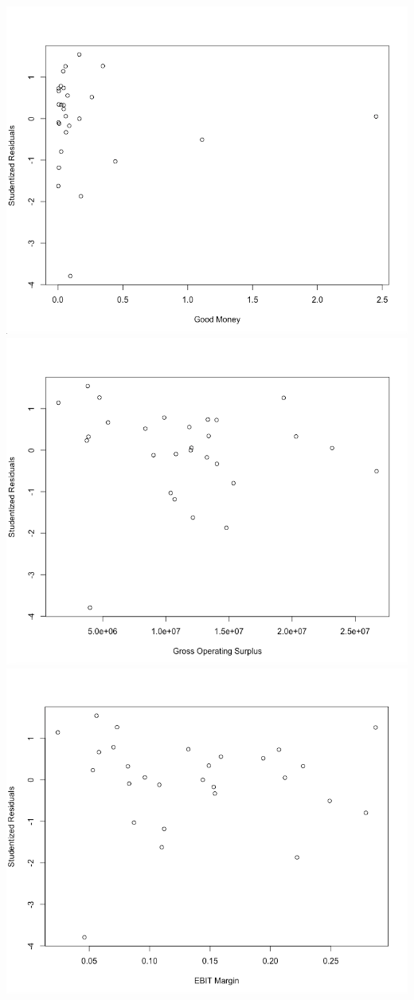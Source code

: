\documentclass[12pt,letterpaper]{article}
\begin{document}
\begin{center}
\includegraphics[scale=0.3]{pic14.png}
\includegraphics[scale=0.3]{pic15.png}
\includegraphics[scale=0.3]{pic16.png}
\end{center}
\end{document}
